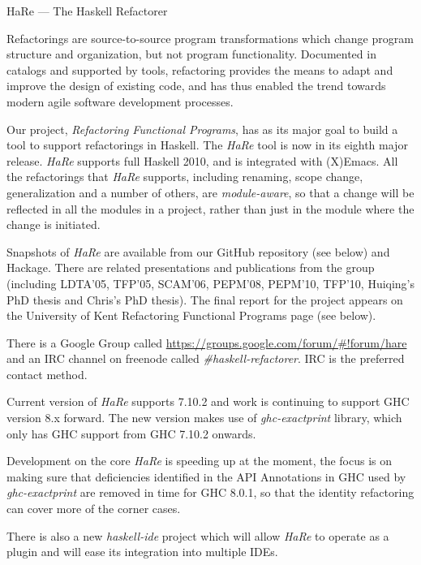 \documentclass[DIV16,twocolumn,10pt]{scrreprt}
\begin{document}
\begin{hcarentry}[updated]{HaRe --- The Haskell Refactorer}
\label{hare}
\makeheader

Refactorings are source-to-source program transformations which change
program structure and organization, but not program functionality.
Documented in catalogs and supported by tools, refactoring provides
the means to adapt and improve the design of existing code, and has
thus enabled the trend towards modern agile software development
processes.

Our project, \emph{Refactoring Functional Programs}, has as its major
goal to build a tool to support refactorings in Haskell. The \emph{HaRe} tool
is now in its eighth major release. \emph{HaRe} supports full Haskell 2010,
and is integrated with (X)Emacs. All the refactorings that \emph{HaRe}
supports, including renaming, scope change, generalization and a
number of others, are \emph{module-aware}, so that a change will be
reflected in all the modules in a project, rather than just in the
module where the change is initiated.

Snapshots of \emph{HaRe} are available from our GitHub repository (see below)
and Hackage. There are related presentations and publications from the
group (including LDTA'05, TFP'05, SCAM'06, PEPM'08, PEPM'10, TFP'10,
Huiqing's PhD thesis and Chris's PhD thesis). The final report for the
project appears on the University of Kent Refactoring Functional
Programs page (see below).

There is a Google Group called
\url{https://groups.google.com/forum/#!forum/hare} and an IRC channel on
freenode called \emph{\#haskell-refactorer}. IRC is the preferred contact method.

Current version of \emph{HaRe} supports 7.10.2 and work is continuing to support GHC version 8.x forward.
The new version makes use of \emph{ghc-exactprint} library, which
only has GHC support from GHC 7.10.2 onwards. 

Development on the core \emph{HaRe} is speeding up at the moment, the focus is on
making sure that deficiencies identified in the API Annotations in GHC used by
\emph{ghc-exactprint} are removed in time for GHC 8.0.1, so that the identity
refactoring can cover more of the corner cases.

There is also a new \emph{haskell-ide} project which will allow \emph{HaRe} to operate
as a plugin and will ease its integration into multiple IDEs.


\end{hcarentry}
\end{document}
